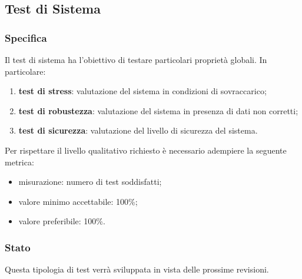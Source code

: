 \subsection{Test di Sistema}

	\subsubsection{Specifica}
		Il test di sistema ha l'obiettivo di testare particolari proprietà globali. In particolare:
		\begin{enumerate}
			\item{\textbf{test di stress}: valutazione del sistema in condizioni di sovraccarico;}
			\item{\textbf{test di robustezza}: valutazione del sistema in presenza di dati non corretti;}
			\item{\textbf{test di sicurezza}: valutazione del livello di sicurezza del sistema.}
		\end{enumerate}
		Per rispettare il livello qualitativo richiesto è necessario adempiere la seguente metrica:
		\begin{itemize}
			\item{misurazione: numero di test soddisfatti;}
			\item{valore minimo accettabile: 100\%;}
			\item{valore preferibile: 100\%.}
		\end{itemize}
	
	
	\subsubsection{Stato}
		Questa tipologia di test verrà sviluppata in vista delle prossime revisioni.